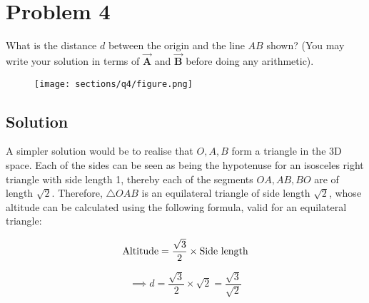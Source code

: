 \section*{Problem 4}

What is the distance \( d \) between the origin and the line \( AB \) shown?
(You may write your solution in terms of \( \vec{\mathbf{A}} \) and \( \vec{\mathbf{B}} \) before doing any arithmetic).

\begin{figure*}[h]
    \centering
    \texttt{[image: sections/q4/figure.png]}
\end{figure*}

\subsection*{Solution}

A simpler solution would be to realise that \( O, A, B \) form a triangle in the 3D space.
Each of the sides can be seen as being the hypotenuse for an isosceles right triangle with side length 1, thereby each of the segments \( OA, AB, BO \) are of length \( \sqrt{2} \).
Therefore, \( \triangle OAB \) is an equilateral triangle of side length \( \sqrt{2} \), whose altitude can be calculated using the following formula, valid for an equilateral triangle:

\[
    \text{Altitude} = \frac{\sqrt{3}}{2} \times \text{Side length} \\
\]

\[
    \implies d = \frac{\sqrt{3}}{2} \times \sqrt{2} = \frac{\sqrt{3}}{\sqrt{2}}
\]
